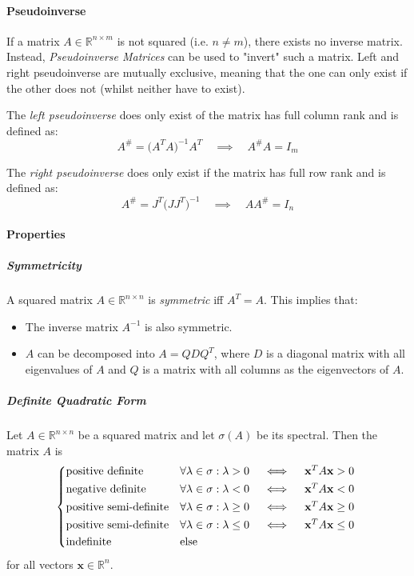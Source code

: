 \documentclass[a4paper, 11pt, accentcolor = tud3b]{tudreport}
\newcommand{\R}{\ensuremath{\mathbb{R}}}
\renewcommand{\vec}[1]{\mathbf{#1}}
\begin{document}
			\paragraph{Pseudoinverse}
				If a matrix \( A \in \R^{n \times m} \) is not squared (i.e. \( n \neq m \)), there exists no inverse matrix. Instead, \emph{Pseudoinverse Matrices} can be used to "invert" such a matrix. Left and right pseudoinverse are mutually exclusive, meaning that the one can only exist if the other does not (whilst neither have to exist).

				The \emph{left pseudoinverse} does only exist of the matrix has full column rank and is defined as:
				\begin{equation}
					A^{\#} = \big( A^T A \big)^{-1} A^T \quad\implies\quad A^{\#}A = I_m
				\end{equation}

				The \emph{right pseudoinverse} does only exist if the matrix has full row rank and is defined as:
				\begin{equation}
					A^{\#} = J^T \big(JJ^T\big)^{-1} \quad\implies\quad AA^{\#} = I_n
				\end{equation}

			\paragraph{Properties}
				\subparagraph{Symmetricity} A squared matrix \( A \in \R^{n \times n} \) is \emph{symmetric} iff \( A^T = A \). This implies that:
				\begin{itemize}
					\item The inverse matrix \(A^{-1}\) is also symmetric.
					\item \(A\) can be decomposed into \( A = QDQ^T \), where \(D\) is a diagonal matrix with all eigenvalues of \(A\) and \(Q\) is a matrix with all columns as the eigenvectors of \(A\).
				\end{itemize}

				\subparagraph{Definite Quadratic Form} Let \(A\in\R^{n \times n}\) be a squared matrix and let \( \sigma(A) \) be its spectral. Then the matrix \(A\) is
				\begin{equation}
					\begin{cases*}
						\textrm{positive definite} & \(\forall \lambda \in \sigma : \lambda > 0 \quad\iff\quad \vec{x}^TA\vec{x} > 0\) \\
						\textrm{negative definite} & \(\forall \lambda \in \sigma : \lambda < 0 \quad\iff\quad \vec{x}^TA\vec{x} < 0\) \\
						\textrm{positive semi-definite} & \(\forall \lambda \in \sigma : \lambda \geq 0 \quad\iff\quad \vec{x}^TA\vec{x} \geq 0\) \\
						\textrm{positive semi-definite} & \(\forall \lambda \in \sigma : \lambda \leq 0 \quad\iff\quad \vec{x}^TA\vec{x} \leq 0\) \\
						\textrm{indefinite} & else
					\end{cases*}
				\end{equation}
				for all vectors \(\vec{x}\in\R^n\).
\end{document}
